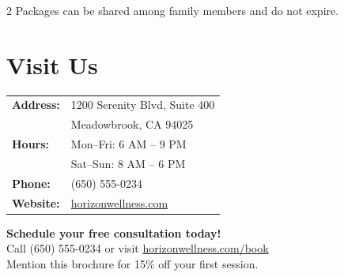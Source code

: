 \documentclass[
    language=english,
    doctype=brochure,
    institution=none,
]{../../omnilatex}
\begin{document}
\begin{multicols}{2}
Packages can be shared among family members and do not expire.

\section*{Visit Us}

\begin{tabular}{ll}
    \textbf{Address:}    & 1200 Serenity Blvd, Suite 400 \\
                         & Meadowbrook, CA 94025 \\
    \textbf{Hours:}      & Mon--Fri: 6 AM -- 9 PM \\
                         & Sat--Sun: 8 AM -- 6 PM \\
    \textbf{Phone:}      & (650) 555-0234 \\
    \textbf{Website:}    & \href{https://horizonwellness.com}{horizonwellness.com} \\
\end{tabular}

\vspace{1em}

\begin{center}
    \textbf{Schedule your free consultation today!}\\[4pt]
    Call (650) 555-0234 or visit \href{https://horizonwellness.com/book}{horizonwellness.com/book}\\[2pt]
    {\small Mention this brochure for 15\% off your first session.}
\end{center}

\end{multicols}
\end{document}
